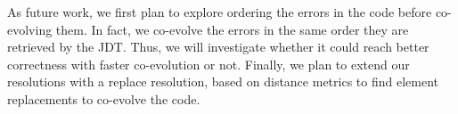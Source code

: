 As future work, we first plan to explore ordering the errors in the code before co-evolving them. In fact, we co-evolve the errors in the same order they are retrieved by the JDT. Thus, we will investigate whether it could reach better correctness with faster co-evolution or not. 
%
Finally, we plan to extend our resolutions with a replace resolution, based on distance metrics to find element replacements to co-evolve the code.   

%
%


